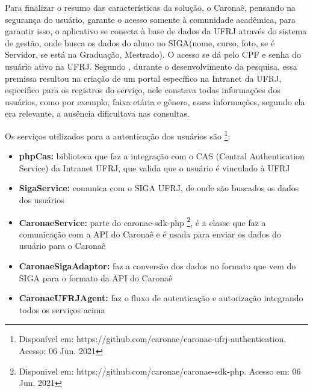 Para finalizar o resumo das características da solução, o Caronaê, pensando na segurança do usuário, garante o acesso somente à comunidade acadêmica, para garantir isso, o aplicativo se conecta à base de dados da UFRJ através do sistema de gestão, onde busca os dados do aluno no SIGA(nome, curso, foto, se é Servidor, se está na Graduação, Mestrado). O acesso se dá pelo CPF e senha do usuário ativo na UFRJ. Segundo \cite{caronae}, durante o desenvolvimento da pesquisa, essa premissa resultou na criação de um portal específico na Intranet da UFRJ, especifico para os registros do serviço, nele constava todas informações dos usuários, como por exemplo, faixa etária e gênero, essas informações, segundo ela era relevante, a ausência dificultava nas consultas.

Os serviços utilizados para a autenticação dos usuários são \footnote{Disponível em: https://github.com/caronae/caronae-ufrj-authentication. Acesso: 06 Jun. 2021}:

\begin{itemize}
   

 \item \textbf{phpCas:} biblioteca que faz a integração com o CAS (Central Authentication Service) da Intranet UFRJ, que valida que o usuário é vinculado à UFRJ

 \item \textbf{SigaService:} comunica com o SIGA UFRJ, de onde são buscados os dados dos usuários 

 \item \textbf{CaronaeService:} parte do caronae-sdk-php \footnote{Disponivel em: https://github.com/caronae/caronae-sdk-php. Acesso em: 06 Jun. 2021}, é a classe que faz a comunicação com a API do Caronaê e é usada para enviar os dados do usuário para o Caronaê

 \item \textbf{CaronaeSigaAdaptor:} faz a conversão dos dados no formato que vem do SIGA para o formato da API do Caronaê

 \item \textbf{CaronaeUFRJAgent:} faz o fluxo de autenticação e autorização integrando todos os serviços acima
\end{itemize}


